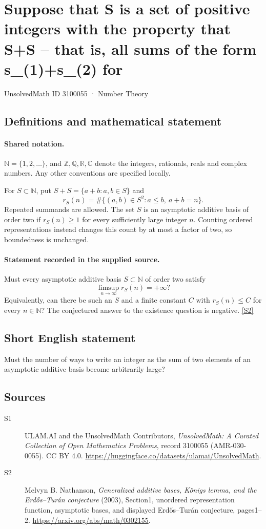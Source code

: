 \documentclass[11pt]{article}
\newcommand{\sref}[2]{\hyperlink{source:#1:#2}{[S#2]}}
\begin{document}
\setcounter{section}{3100054}
\section{Suppose that S is a set of positive integers with the property that S+S -- that is, all sums of the form s\_(1)+s\_(2) for}\label{3100055}
{\small\sffamily UnsolvedMath ID 3100055 · Number Theory}
\subsection{Definitions and mathematical statement}

\paragraph{Shared notation.}$\mathbb N=\{1,2,\ldots\}$, and $\mathbb Z,\mathbb Q,\mathbb R,\mathbb C$ denote the integers, rationals, reals and complex numbers. Any other conventions are specified locally.


For $S\subset\mathbb N$, put $S+S=\{a+b:a,b\in S\}$ and
\[r_S(n)=\#\{(a,b)\in S^2:a\le b,\ a+b=n\}.\]
Repeated summands are allowed. The set $S$ is an asymptotic additive basis of order two if $r_S(n)\ge1$ for every sufficiently large integer $n$. Counting ordered representations instead changes this count by at most a factor of two, so boundedness is unchanged.

\paragraph{Statement recorded in the supplied source.}
Must every asymptotic additive basis $S\subset\mathbb N$ of order two satisfy
\[\limsup_{n\to\infty}r_S(n)=+\infty?\]
Equivalently, can there be such an $S$ and a finite constant $C$ with $r_S(n)\le C$ for every $n\in\mathbb N$? The conjectured answer to the existence question is negative. \sref{3100055}{2}

\subsection{Short English statement}
Must the number of ways to write an integer as the sum of two elements of an asymptotic additive basis become arbitrarily large?
\subsection{Sources}
\begin{description}
\item[\hypertarget{source:3100055:1}{S1}] ULAM.AI and the UnsolvedMath Contributors, \emph{UnsolvedMath: A Curated Collection of Open Mathematics Problems}, record 3100055 (AMR-030-0055). CC BY 4.0. \url{https://huggingface.co/datasets/ulamai/UnsolvedMath}.
\item[\hypertarget{source:3100055:2}{S2}] Melvyn B. Nathanson, \emph{Generalized additive bases, König\textquotesingle s lemma, and the Erdős--Turán conjecture} (2003), Section1, unordered representation function, asymptotic bases, and displayed Erdős--Turán conjecture, pages1--2. \url{https://arxiv.org/abs/math/0302155}.
\end{description}
\label{end:3100055}
\end{document}
